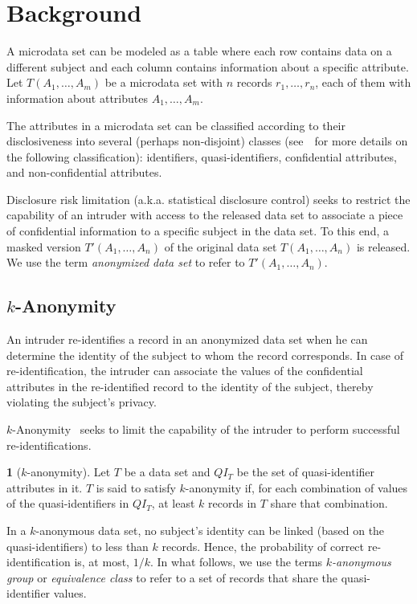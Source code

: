 \documentclass[10pt,journal,compsoc]{IEEEtran}
\theoremstyle{definition}
\newtheorem{defn}{\protect\definitionname}
\theoremstyle{plain}
\providecommand{\definitionname}{Definition}
\begin{document}
\section{Background}
\label{sec:background}

A microdata set can be modeled as a table where each row contains
data on a different subject and each column contains information
about a specific attribute. Let $T(A_{1},\ldots,A_{m})$ be a microdata
set with $n$ records $r_{1},\ldots,r_{n}$, each of them with information
about attributes $A_{1},\ldots,A_{m}$.

The attributes in a microdata set can be classified according to their
disclosiveness into several (perhaps non-disjoint) classes
(see~\cite{Hundepool2012sdc}~for more details on the following
classification):
identifiers, quasi-identifiers, confidential attributes, and non-confidential attributes.



Disclosure risk limitation (a.k.a. statistical disclosure control) 
seeks to restrict the capability 
of an intruder
with access to the released data set to
associate a piece of confidential
information to a specific subject in the data set.  
To this end, a masked version $T'(A_{1},\ldots,A_{n})$
of the original data set $T(A_{1},\ldots,A_{n})$ is released. We use
the term \emph{anonymized data set} to refer to $T'(A_{1},\ldots,A_{n})$. 

\subsection{$k$-Anonymity}

An intruder re-identifies a record in an anonymized data set when
he can determine the identity of the subject
to whom the record corresponds.
In case of re-identification, the intruder can 
associate the values of the confidential attributes
in the re-identified record to the 
identity of the subject, thereby violating the subject's privacy. 


$k$-Anonymity~\cite{Samarati1998Protecting,Sweeney2002kAnonymity}
seeks to limit the capability of the intruder to perform successful
re-identifications. 


\begin{defn}[$k$-anonymity]
	Let $T$ be a data set and $QI_{T}$ be the 
set of quasi-identifier attributes in it. 
$T$ is said to satisfy $k$-anonymity if, for
each combination of values of the quasi-identifiers in $QI_T$, at least
$k$ records in $T$ share that combination.
\end{defn}
In a $k$-anonymous data set, no subject's identity 
can be linked (based on the quasi-identifiers) 
to less than $k$ records. Hence, the probability of correct
re-identification is, at most, $1/k$.
In what follows, 
we use the terms \emph{$k$-anonymous
       group} or \emph{equivalence class} to refer to a set of records that
share the quasi-identifier values.
\end{document}
